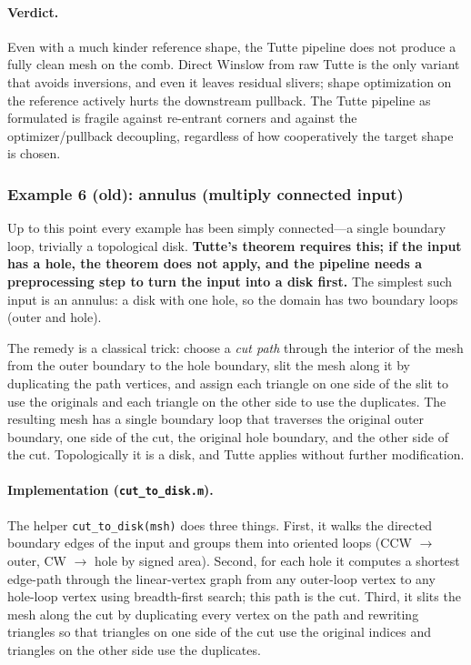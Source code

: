 \documentclass[11pt]{article}
\begin{document}
\paragraph{Verdict.}
Even with a much kinder reference shape, the Tutte pipeline
does not produce a fully clean mesh on the comb. Direct Winslow
from raw Tutte is the only variant that avoids inversions, and
even it leaves residual slivers; shape optimization on the
reference actively hurts the downstream pullback. The Tutte
pipeline as formulated is fragile against re-entrant corners
and against the optimizer/pullback decoupling, regardless of
how cooperatively the target shape is chosen.

\iffalse  %
\subsubsection{Example 6 (old): annulus (multiply connected input)}
\label{sec:tutte-ex-annulus}

Up to this point every example has been simply connected---a single
boundary loop, trivially a topological disk. \textbf{Tutte's
theorem requires this; if the input has a hole, the theorem does
not apply, and the pipeline needs a preprocessing step to turn the
input into a disk first.} The simplest such input is an annulus:
a disk with one hole, so the domain has two boundary loops (outer
and hole).

The remedy is a classical trick: choose a \emph{cut path} through
the interior of the mesh from the outer boundary to the hole
boundary, slit the mesh along it by duplicating the path vertices,
and assign each triangle on one side of the slit to use the
originals and each triangle on the other side to use the
duplicates. The resulting mesh has a single boundary loop that
traverses the original outer boundary, one side of the cut, the
original hole boundary, and the other side of the cut. Topologically
it is a disk, and Tutte applies without further modification.

\paragraph{Implementation (\texttt{cut\_to\_disk.m}).}
The helper \texttt{cut\_to\_disk(msh)} does three things. First, it
walks the directed boundary edges of the input and groups them into
oriented loops (CCW $\to$ outer, CW $\to$ hole by signed area).
Second, for each hole it computes a shortest edge-path through the
linear-vertex graph from any outer-loop vertex to any hole-loop
vertex using breadth-first search; this path is the cut. Third, it
slits the mesh along the cut by duplicating every vertex on the
path and rewriting triangles so that triangles on one side of the
cut use the original indices and triangles on the other side use
the duplicates.
\end{document}
